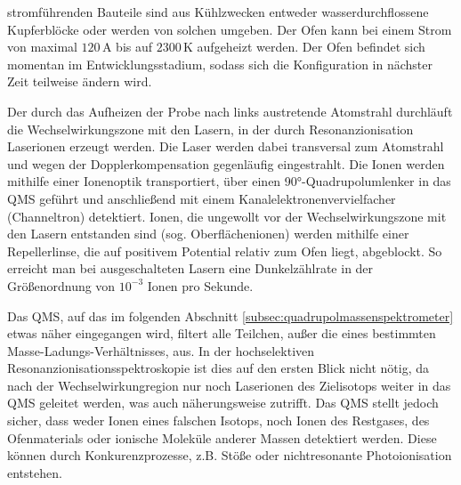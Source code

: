 stromführenden Bauteile sind aus Kühlzwecken entweder wasserdurchflossene
Kupferblöcke oder werden von solchen umgeben. Der Ofen kann bei einem Strom von
maximal $120\,$A bis auf $2300\,$K aufgeheizt werden. Der Ofen
befindet sich momentan im Entwicklungsstadium, sodass sich die
Konfiguration in nächster Zeit teilweise ändern wird.\par
Der durch das Aufheizen der Probe nach links austretende Atomstrahl durchläuft
die Wechselwirkungszone mit den Lasern, in der durch Resonanzionisation
Laserionen erzeugt werden. Die Laser werden dabei transversal zum Atomstrahl
und wegen der Dopplerkompensation gegenläufig eingestrahlt. Die Ionen werden
mithilfe einer Ionenoptik transportiert, über einen 90°-Quadrupolumlenker in das
QMS geführt und anschließend mit einem Kanalelektronenvervielfacher
(Channeltron) detektiert.
Ionen, die ungewollt vor der Wechselwirkungszone mit den Lasern entstanden sind
(sog.
Oberflächenionen) werden mithilfe einer Repellerlinse, die auf positivem
Potential relativ zum Ofen liegt, abgeblockt.
So erreicht man bei ausgeschalteten Lasern eine Dunkelzählrate in der
Größenordnung von $10^{-3}$ Ionen pro Sekunde.\par
Das QMS, auf das im folgenden Abschnitt \ref{subsec:quadrupolmassenspektrometer}
etwas näher eingegangen wird, filtert alle Teilchen, außer die eines bestimmten
Masse-Ladungs-Verhältnisses, aus. In der hochselektiven
Resonanzionisationsspektroskopie ist dies auf den ersten Blick nicht nötig, da nach der Wechselwirkungregion nur noch Laserionen des Zielisotops weiter in das QMS geleitet werden, was auch
näherungsweise zutrifft. Das QMS stellt jedoch sicher, dass weder Ionen
eines falschen Isotops, noch Ionen des Restgases, des Ofenmaterials oder ionische
Moleküle anderer Massen detektiert werden. Diese können durch Konkurenzprozesse,
z.B. Stöße oder nichtresonante Photoionisation entstehen.

